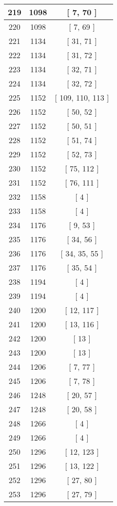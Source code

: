 \begin{center}
\begin{longtable}[H]{|| c c c ||}
\hline
219 & 1098 & [ 7, 70 ] \\ 
\hline
220 & 1098 & [ 7, 69 ] \\ 
\hline
221 & 1134 & [ 31, 71 ] \\ 
\hline
222 & 1134 & [ 31, 72 ] \\ 
\hline
223 & 1134 & [ 32, 71 ] \\ 
\hline
224 & 1134 & [ 32, 72 ] \\ 
\hline
225 & 1152 & [ 109, 110, 113 ] \\ 
\hline
226 & 1152 & [ 50, 52 ] \\ 
\hline
227 & 1152 & [ 50, 51 ] \\ 
\hline
228 & 1152 & [ 51, 74 ] \\ 
\hline
229 & 1152 & [ 52, 73 ] \\ 
\hline
230 & 1152 & [ 75, 112 ] \\ 
\hline
231 & 1152 & [ 76, 111 ] \\ 
\hline
232 & 1158 & [ 4 ] \\ 
\hline
233 & 1158 & [ 4 ] \\ 
\hline
234 & 1176 & [ 9, 53 ] \\ 
\hline
235 & 1176 & [ 34, 56 ] \\ 
\hline
236 & 1176 & [ 34, 35, 55 ] \\ 
\hline
237 & 1176 & [ 35, 54 ] \\ 
\hline
238 & 1194 & [ 4 ] \\ 
\hline
239 & 1194 & [ 4 ] \\ 
\hline
240 & 1200 & [ 12, 117 ] \\ 
\hline
241 & 1200 & [ 13, 116 ] \\ 
\hline
242 & 1200 & [ 13 ] \\ 
\hline
243 & 1200 & [ 13 ] \\ 
\hline
244 & 1206 & [ 7, 77 ] \\ 
\hline
245 & 1206 & [ 7, 78 ] \\ 
\hline
246 & 1248 & [ 20, 57 ] \\ 
\hline
247 & 1248 & [ 20, 58 ] \\ 
\hline
248 & 1266 & [ 4 ] \\ 
\hline
249 & 1266 & [ 4 ] \\ 
\hline
250 & 1296 & [ 12, 123 ] \\ 
\hline
251 & 1296 & [ 13, 122 ] \\ 
\hline
252 & 1296 & [ 27, 80 ] \\ 
\hline
253 & 1296 & [ 27, 79 ] \\ 
\hline

\end{longtable}
\end{center}
